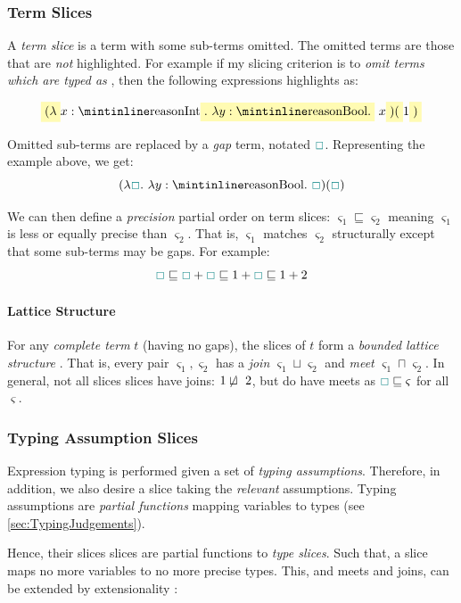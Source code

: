\subsubsection{Term Slices}
A \textit{term slice} is a term with some sub-terms omitted. The omitted terms are those that are \textit{not} highlighted. For example if my slicing criterion is to \textit{omit terms which are typed as} , then the following expressions highlights as:

\[\hlcmaths[yellow!30]{(\lambda} x: \code{Int}\hlcmaths[yellow!30]{.\ \lambda y : \code{Bool}.}\ x\hlcmaths[yellow!30]{)(}1\hlcmaths[yellow!30]{)}\]


Omitted sub-terms are replaced by a \textit{gap} term, notated ${\color{teal}\Box}$. Representing the example above, we get:
\[(\lambda \gap.\ \lambda y : \code{Bool}.\ \gap)(\gap)\]

We can then define a \textit{precision} partial order \cite{PartialOrder} on term slices: $\varsigma_1 \sqsubseteq \varsigma_2$ meaning $\varsigma_1$ is less or equally precise than $\varsigma_2$. That is, $\varsigma_1$ matches $\varsigma_2$ structurally except that some sub-terms may be gaps. For example:
\[{\color{teal}\Box} \sqsubseteq{\color{teal}\Box} + {\color{teal}\Box}\sqsubseteq 1 + {\color{teal}\Box} \sqsubseteq 1 + 2\]

\paragraph{Lattice Structure}\label{sec:JoinTypesTheory} For any \textit{complete term} $t$ (having no gaps), the slices of $t$ form a \textit{bounded lattice structure} \cite{Lattice}. That is, every pair $\varsigma_1, \varsigma_2$ has a \textit{join} $\varsigma_1 \sqcup \varsigma_2$ and \textit{meet} $\varsigma_1 \sqcap \varsigma_2$. In general, not all slices slices have joins: $1 \centernot\sqcup\ 2$, but do have meets as ${\color{teal}\Box} \sqsubseteq \varsigma$ for all $\varsigma$.
 
\subsubsection{Typing Assumption Slices}
Expression typing is performed given a set of \textit{typing assumptions}. Therefore, in addition, we also desire a slice taking the \textit{relevant} assumptions. Typing assumptions are \textit{partial functions} mapping variables to types (see \cref{sec:TypingJudgements}). 

Hence, their slices slices are partial functions to \textit{type slices}. Such that, a slice maps no more variables to no more precise types. This, and meets and joins, can be extended by extensionality \cite{Extensionality}:

